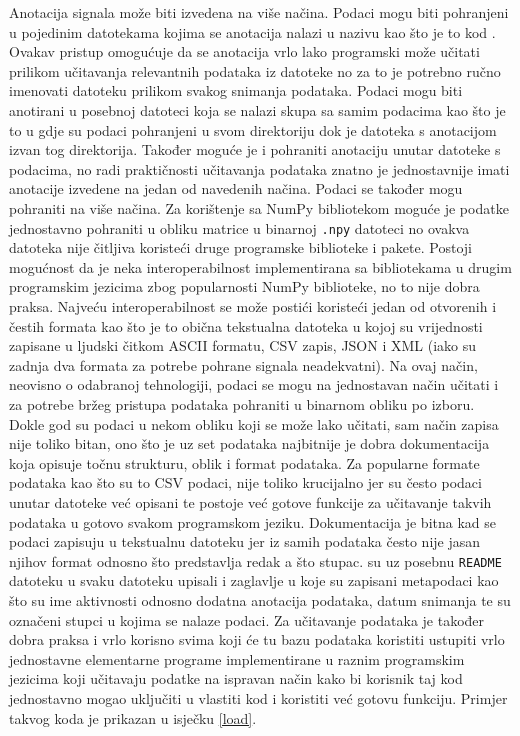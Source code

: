 \documentclass[times, utf8, diplomski]{fer}
\begin{document}
Anotacija signala može biti izvedena na više načina. Podaci mogu biti pohranjeni u pojedinim datotekama kojima
se anotacija nalazi u nazivu kao što je to kod \cite{HuGaDB}. Ovakav pristup omogućuje da se anotacija vrlo
lako programski može učitati prilikom učitavanja relevantnih podataka iz datoteke no za to je potrebno ručno
imenovati datoteku prilikom svakog snimanja podataka. Podaci mogu biti anotirani u posebnoj datoteci koja se
nalazi skupa sa samim podacima kao što je to u \cite{zou2020gait} gdje su podaci pohranjeni u svom direktoriju
dok je datoteka s anotacijom izvan tog direktorija. Također moguće je i pohraniti anotaciju unutar datoteke s
podacima, no radi praktičnosti učitavanja podataka znatno je jednostavnije imati anotacije izvedene na jedan od
navedenih načina. Podaci se također mogu pohraniti na više načina. Za korištenje sa NumPy bibliotekom moguće je
podatke jednostavno pohraniti u obliku matrice u binarnoj \texttt{.npy} datoteci no ovakva datoteka nije čitljiva
koristeći druge programske biblioteke i pakete. Postoji mogućnost da je neka interoperabilnost implementirana
sa bibliotekama u drugim programskim jezicima zbog popularnosti NumPy biblioteke, no to nije dobra praksa.
Najveću interoperabilnost se može postići koristeći jedan od otvorenih i čestih formata
kao što je to obična tekstualna datoteka u kojoj su vrijednosti zapisane u ljudski čitkom ASCII formatu,
CSV zapis, JSON i XML (iako su zadnja dva formata za potrebe pohrane signala neadekvatni).
Na ovaj način, neovisno o odabranoj tehnologiji, podaci se mogu na jednostavan način učitati i za potrebe bržeg
pristupa podataka pohraniti u binarnom obliku po izboru. Dokle god su podaci u nekom obliku koji se može lako
učitati, sam način zapisa nije toliko bitan, ono što je uz set podataka najbitnije je dobra dokumentacija koja
opisuje točnu strukturu, oblik i format podataka. Za popularne formate podataka kao što su to CSV podaci, nije toliko
krucijalno jer su često podaci unutar datoteke već opisani te postoje već gotove funkcije za učitavanje takvih
podataka u gotovo svakom programskom jeziku. Dokumentacija je bitna kad se podaci zapisuju u tekstualnu datoteku
jer iz samih podataka često nije jasan njihov format odnosno što predstavlja redak a što stupac.
\cite{HuGaDB} su uz posebnu \texttt{README} datoteku u svaku datoteku upisali i zaglavlje u koje su zapisani
metapodaci kao što su ime aktivnosti odnosno dodatna anotacija podataka, datum snimanja te su označeni stupci
u kojima se nalaze podaci. Za učitavanje podataka je također dobra praksa i vrlo korisno svima koji će tu bazu
podataka koristiti ustupiti vrlo jednostavne elementarne programe implementirane u raznim programskim jezicima
koji učitavaju podatke na ispravan način kako bi korisnik taj kod jednostavno mogao uključiti u vlastiti kod i
koristiti već gotovu funkciju. Primjer takvog koda je prikazan u isječku \ref{load}.
\end{document}
